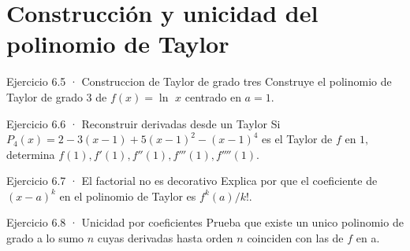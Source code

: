 \documentclass[10pt,a4paper,oneside,openany]{book}
\begin{document}
\section{Construcción y unicidad del polinomio de Taylor}
\begin{PSevenExerciseFixed}{Ejercicio 6.5 · Construccion de Taylor de grado tres}
Construye el polinomio de Taylor de grado \(3\) de \(f(x)=\ln\) \(x\) centrado en \(a=1\).
\end{PSevenExerciseFixed}
\begin{PSevenExerciseFixed}{Ejercicio 6.6 · Reconstruir derivadas desde un Taylor}
Si \(P_4(x)=2-3(x-1)+5(x-1)^{2}-(x-1)^{4}\) es el Taylor de \(f\) en \(1,\) determina \(f(1),f'(1),f''(1),f'''(1),f''''(1)\).
\end{PSevenExerciseFixed}
\begin{PSevenExerciseFixed}{Ejercicio 6.7 · El factorial no es decorativo}
Explica por que el coeficiente de \((x-a)^k\) en el polinomio de Taylor es \(f^{k}(a)/k!\).
\end{PSevenExerciseFixed}
\begin{PSevenExerciseFixed}{Ejercicio 6.8 · Unicidad por coeficientes}
Prueba que existe un unico polinomio de grado a lo sumo \(n\) cuyas derivadas hasta orden \(n\) coinciden con las de \(f\) en a.
\end{PSevenExerciseFixed}
\end{document}
